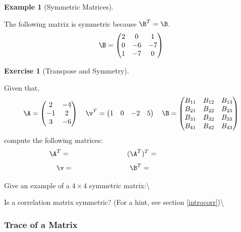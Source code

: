 \documentclass[
]{article}
\theoremstyle{definition}
\theoremstyle{definition}
\newtheorem{example}{Example}[section]
\theoremstyle{definition}
\newtheorem{exercise}{Exercise}[section]
\theoremstyle{definition}
\theoremstyle{remark}
\begin{document}
\begin{example}[Symmetric Matrices]
\protect\hypertarget{exm:sym}{}\label{exm:sym}

The following matrix is symmetric because \(\B^T = \B\).
\[\B=\left(\begin{matrix} 2 & 0 & 1 \\0&-6&-7\\1&-7&0 \end{matrix}\right)\]

\end{example}

\begin{exercise}[Transpose and Symmetry]
\protect\hypertarget{exr:transposesym}{}\label{exr:transposesym}

Given that,
\[\A=\left(\begin{matrix} 2 & -4 \\-1&2\\3&-6 \end{matrix}\right) \quad \v^T = \left(\begin{matrix} 1 & 0 & -2 & 5\end{matrix}\right) \quad \B=\left(\begin{matrix} B_{11}&B_{12}&B_{13}\\B_{21}&B_{22}&B_{23}\\B_{31}&B_{32}&B_{33}\\B_{41}&B_{42}&B_{43}\end{matrix}\right)\]
compute the following matrices:
\vspace{.5cm}
\[\A^T= \qquad \qquad \qquad \qquad (\A^T)^T= \qquad \qquad \qquad \qquad\]
\vspace{1cm}
\[ \v= \qquad \qquad \qquad \qquad \B^T = \qquad \qquad\qquad \qquad \]
\vspace{1cm}

Give an example of a \(4\times 4\) symmetric matrix:\textbackslash{}
\vspace{1.5cm}

Is a correlation matrix symmetric? (For a hint, see section \ref{introcorr})\textbackslash{}
\vspace{.5cm}

\end{exercise}

\hypertarget{trace-of-a-matrix}{%
\subsubsection{Trace of a Matrix}\label{trace-of-a-matrix}}
\end{document}
